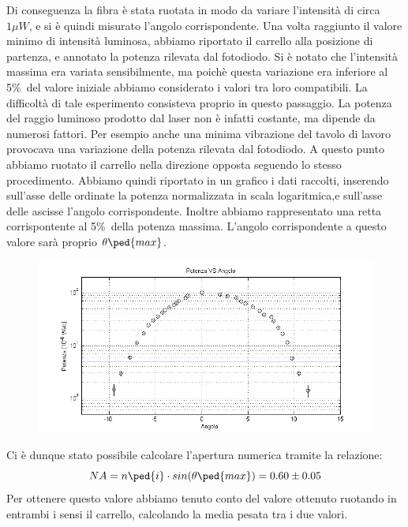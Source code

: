 \documentclass[a4paper,11pt]{article}
\begin{document}
Di conseguenza la fibra è stata ruotata in modo da variare l'intensità di circa $ 1\mu W$, e si è quindi misurato l'angolo corrispondente. Una volta raggiunto il valore minimo di intensità luminosa, abbiamo riportato il carrello alla posizione di partenza, e annotato la potenza rilevata dal fotodiodo. Si è notato che l'intensità massima era variata sensibilmente, ma poichè questa variazione era inferiore al 5\%\ del valore iniziale abbiamo considerato i valori tra loro compatibili. La difficoltà di tale esperimento consisteva proprio in questo passaggio. La potenza del raggio luminoso prodotto dal laser non è infatti costante, ma dipende da numerosi fattori. Per esempio anche una minima vibrazione del tavolo di lavoro provocava una variazione della potenza rilevata dal fotodiodo. A questo punto abbiamo ruotato il carrello nella direzione opposta seguendo lo stesso procedimento. Abbiamo quindi riportato in un grafico i dati raccolti, inserendo sull'asse delle ordinate la potenza normalizzata in scala logaritmica,e sull'asse delle ascisse l'angolo corrispondente. Inoltre abbiamo rappresentato una retta corrispontente al 5\%\ della potenza massima. L'angolo corrispondente a questo valore sarà proprio $\theta \ped{max}$.  


\begin{center} 
\begin{figure}[htpd]
\hspace{-30 pt}
\includegraphics[scale=0.90]{Grafico_matlab.png}


\end{figure}
\end{center}
\vspace{5 cm}
Ci è dunque stato possibile calcolare l'apertura numerica tramite la relazione: $$NA=n\ped{i}\cdot sin(\theta \ped{max})= 0.60 \pm 0.05 $$  
Per ottenere questo valore abbiamo tenuto conto del valore ottenuto ruotando in entrambi i sensi il carrello, calcolando la media pesata tra i due valori.
\end{document}
